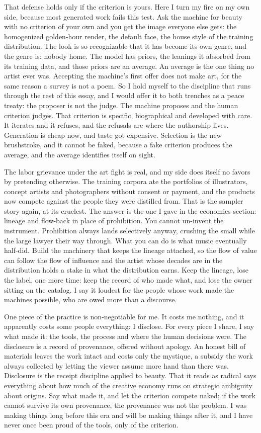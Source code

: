 \documentclass[11pt]{article}
\begin{document}
That defense holds only if the criterion is yours. Here I turn my fire on my own side, because most generated work fails this test. Ask the machine for beauty with no criterion of your own and you get the image everyone else gets: the homogenized golden-hour render, the default face, the house style of the training distribution. The look is so recognizable that it has become its own genre, and the genre is: nobody home. The model has priors, the leanings it absorbed from its training data, and those priors are an average. An average is the one thing no artist ever was. Accepting the machine's first offer does not make art, for the same reason a survey is not a poem. So I hold myself to the discipline that runs through the rest of this essay, and I would offer it to both trenches as a peace treaty: the proposer is not the judge. The machine proposes and the human criterion judges. That criterion is specific, biographical and developed with care. It iterates and it refuses, and the refusals are where the authorship lives. Generation is cheap now, and taste got expensive. Selection is the new brushstroke, and it cannot be faked, because a fake criterion produces the average, and the average identifies itself on sight.

The labor grievance under the art fight is real, and my side does itself no favors by pretending otherwise. The training corpora ate the portfolios of illustrators, concept artists and photographers without consent or payment, and the products now compete against the people they were distilled from. That is the sampler story again, at its cruelest. The answer is the one I gave in the economics section: lineage and flow-back in place of prohibition. You cannot un-invent the instrument. Prohibition always lands selectively anyway, crushing the small while the large lawyer their way through. What you can do is what music eventually half-did. Build the machinery that keeps the lineage attached, so the flow of value can follow the flow of influence and the artist whose decades are in the distribution holds a stake in what the distribution earns. Keep the lineage, lose the label, one more time: keep the record of who made what, and lose the owner sitting on the catalog. I say it loudest for the people whose work made the machines possible, who are owed more than a discourse.

One piece of the practice is non-negotiable for me. It costs me nothing, and it apparently costs some people everything: I disclose. For every piece I share, I say what made it: the tools, the process and where the human decisions were. The disclosure is a record of provenance, offered without apology. An honest bill of materials leaves the work intact and costs only the mystique, a subsidy the work always collected by letting the viewer assume more hand than there was. Disclosure is the receipt discipline applied to beauty. That it reads as radical says everything about how much of the creative economy runs on strategic ambiguity about origins. Say what made it, and let the criterion compete naked; if the work cannot survive its own provenance, the provenance was not the problem. I was making things long before this era and will be making things after it, and I have never once been proud of the tools, only of the criterion.
\end{document}
